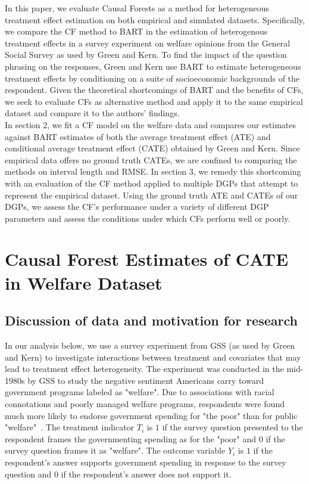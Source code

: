 \documentclass[12pt]{article}
\begin{document}
In this paper, we evaluate Causal Forests as a method for heterogeneous
treatment effect estimation on both empirical and simulated datasets.
Specifically, we compare the CF method to BART in the estimation of heterogenous
treatment effects in a survey experiment on welfare opinions from the General
Social Survey as used by Green and Kern. To find the impact of the question
phrasing on the responses, Green and Kern use BART to estimate heterogeneous
treatment effects by conditioning on a suite of socioeconomic backgrounds of the
respondent. Given the theoretical shortcomings of BART and the benefits of CFs,
we seek to evaluate CFs as alternative method and apply it to the same empirical
dataset and compare it to the authors' findings. \\

In section 2, we fit a CF model on the welfare data and compares our estimates
against BART estimates of both the average treatment effect (ATE) and
conditional average treatment effect (CATE) obtained by Green and Kern. Since
empirical data offers no ground truth CATEs, we are confined to comparing the
methods on interval length and RMSE. In section 3, we remedy this shortcoming
with an evaluation of the CF method applied to multiple DGPs that attempt to
represent the empirical dataset. Using the ground truth ATE and CATEs of our
DGPs, we assess the CF's performance under a variety of different DGP parameters
and assess the conditions under which CFs perform well or poorly. \\

\section{Causal Forest Estimates of CATE in Welfare Dataset} 

\subsection{Discussion of data and motivation for research} 
In our analysis below, we use a survey experiment from GSS (as used by Green and
Kern) to investigate interactions between treatment and covariates that may lead
to treatment effect heterogeneity. The experiment was conducted in the mid-1980s
by GSS to study the negative sentiment Americans carry toward government
programs labeled as "welfare". Due to associations with racial connotations and
poorly managed welfare programs, respondents were found much more likely to
endorse government spending for "the poor" than for public
"welfare"~\cite{rasinski1989}. The treatment indicator $T_i$ is $1$ if the
survey question presented to the respondent frames the governmenting spending as
for the "poor" and $0$ if the survey question frames it as "welfare". The
outcome variable $Y_i$ is $1$ if the respondent's answer supports government
spending in response to the survey question and $0$ if the respondent's answer
does not support it. \\
\end{document}
